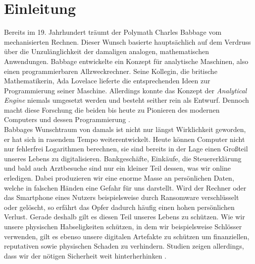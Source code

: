 \documentclass[
    12pt, %
    DIV10,
    ngerman, %
    a4paper, %
    oneside, %
    titlepage, %
    parskip=half, %
    headings=normal, %
    listof=totoc, %
    bibliography=totoc, %
    index=totoc, %
    captions=tableheading, %
    final %
]{scrreprt}
\begin{document}
\newpage
{}
\chapter{Einleitung}
Bereits im 19. Jahrhundert träumt der Polymath Charles Babbage vom mechanisierten Rechnen. Dieser Wunsch basierte hauptsächlich auf dem Verdruss über die Unzulänglichkeit der damaligen analogen, mathematischen Anwendungen. Babbage entwickelte ein Konzept für analytische Maschinen, also einen programmierbaren Allzweckrechner. Seine Kollegin, die britische Mathematikerin, Ada Lovelace lieferte die entsprechenden Ideen zur Programmierung seiner Maschine. Allerdings konnte das Konzept der \emph{Analytical Engine} niemals umgesetzt werden und besteht seither rein als Entwurf. Dennoch macht diese Forschung die beiden bis heute zu Pionieren des modernen Computers und dessen Programmierung \parencite{wilkes1995computing}.\\
Babbages Wunschtraum von damals ist nicht nur längst Wirklichkeit geworden, er hat sich in rasendem Tempo weiterentwickelt. Heute können Computer nicht nur fehlerfrei Logarithmen berechnen, sie sind bereits in der Lage einen Gro{\ss}teil unseres Lebens zu digitalisieren. Bankgeschäfte, Einkäufe, die Steuererklärung und bald auch Arztbesuche sind nur ein kleiner Teil dessen, was wir online erledigen. Dabei produzieren wir eine enorme Masse an persönlichen Daten, welche in falschen Händen eine Gefahr für uns darstellt. Wird der Rechner oder das Smartphone eines Nutzers beispielsweise durch Ransomware verschlüsselt oder gelöscht, so erfährt das Opfer dadurch häufig einen hohen persönlichen Verlust. Gerade deshalb gilt es diesen Teil unseres Lebens zu schützen. Wie wir unsere physischen Habseligkeiten schützen, in dem wir beispielsweise Schlösser verwenden, gilt es ebenso unsere digitalen Artefakte zu schützen um finanziellen, reputativen sowie physischen Schaden zu verhindern. Studien zeigen allerdings, dass wir der nötigen Sicherheit weit hinterherhinken \parencite{Microsoft2019}. 
\end{document}
